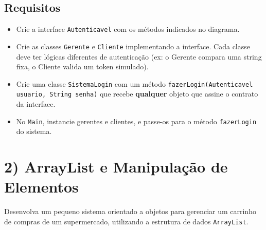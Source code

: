 \documentclass[12pt]{article}
\begin{document}
\subsection*{Requisitos}
\begin{itemize}
    \item Crie a interface \texttt{Autenticavel} com os métodos indicados no diagrama.
    \item Crie as classes \texttt{Gerente} e \texttt{Cliente} implementando a interface. Cada classe deve ter lógicas diferentes de autenticação (ex: o Gerente compara uma string fixa, o Cliente valida um token simulado).
    \item Crie uma classe \texttt{SistemaLogin} com um método \texttt{fazerLogin(Autenticavel usuario, String senha)} que recebe \textbf{qualquer} objeto que assine o contrato da interface.
    \item No \texttt{Main}, instancie gerentes e clientes, e passe-os para o método \texttt{fazerLogin} do sistema.
\end{itemize}

\section*{2) ArrayList e Manipulação de Elementos}
Desenvolva um pequeno sistema orientado a objetos para gerenciar um carrinho de compras de um supermercado, utilizando a estrutura de dados \texttt{ArrayList}.

\begin{center}
\end{center}
\end{document}
